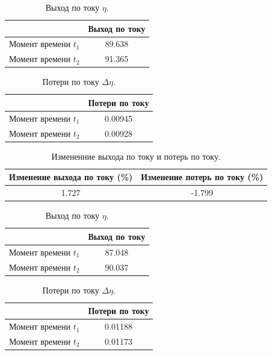 \documentclass{article}
\begin{document}
\begin{table}[ht]
\centering
\begin{tabular}{|c|c|}
\hline
			&Выход по току	\\ 
\hline
Момент времени $t_1$		&89.638	\\  
Момент времени $t_2$		&91.365	\\  
\hline
\end{tabular}
\caption{Выход по току $\eta$.}
\end{table}

\begin{table}[ht]
\centering
\begin{tabular}{|c|c|}
\hline
			&Потери по току	\\
\hline
Момент времени $t_1$		&0.00945\\
Момент времени $t_2$		&0.00928\\  
\hline
\end{tabular}
\caption{Потери по току $\Delta \eta$.}
\end{table}

\begin{table}[ht]
\centering
\begin{tabular}{|c|c|}
\hline
Изменение выхода по току (\%)	& Изменение потерь по току (\%) \\
\hline
1.727 & -1.799\\ 
\hline
\end{tabular}
\caption{Измененние выхода по току и потерь по току.}
\end{table}




\begin{table}[ht]
\centering
\begin{tabular}{|c|c|}
\hline
			&Выход по току	\\
\hline
Момент времени $t_1$	&87.048	\\  
Момент времени $t_2$	&90.037	\\  
\hline
\end{tabular}
\caption{Выход по току $\eta$.}
\end{table}
	

\begin{table}[ht]
\centering
\begin{tabular}{|c|c|}
\hline
			&Потери по току	\\
\hline
Момент времени $t_1$	&0.01188\\  
Момент времени $t_2$	&0.01173\\  
\hline
\end{tabular}
\caption{Потери по току $\Delta \eta$.}
\end{table}
\end{document}
